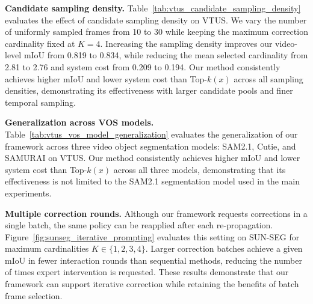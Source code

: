 


\noindent\textbf{Candidate sampling density.}
Table~\ref{tab:vtus_candidate_sampling_density} evaluates the effect of
candidate sampling density on VTUS. We vary the number of
uniformly sampled frames from 10 to 30 while keeping the
maximum correction cardinality fixed at $K=4$.
Increasing the sampling density improves our video-level mIoU
from 0.819 to 0.834, while reducing the mean selected
cardinality from 2.81 to 2.76 and system cost from 0.209
to 0.194. Our method consistently achieves higher mIoU
and lower system cost than Top-$k(x)$ across all sampling
densities, demonstrating its effectiveness with larger
candidate pools and finer temporal sampling.



\noindent\textbf{Generalization across VOS models.}
Table~\ref{tab:vtus_vos_model_generalization} evaluates
the generalization of our framework across three video object
segmentation models: SAM2.1, Cutie, and SAMURAI on VTUS.
Our method consistently achieves higher mIoU and lower system
cost than Top-$k(x)$ across all three models, demonstrating
that its effectiveness is not limited to the SAM2.1 segmentation
model used in the main experiments.



\noindent\textbf{Multiple correction rounds.}
Although our framework requests corrections in a single batch,
the same policy can be reapplied after each re-propagation.
Figure~\ref{fig:sunseg_iterative_prompting} evaluates this setting
on SUN-SEG for maximum cardinalities $K\in\{1,2,3,4\}$.
Larger correction batches achieve a given mIoU in fewer
interaction rounds than sequential methods, reducing the
number of times expert intervention is requested.
These results demonstrate that our framework can support
iterative correction while retaining the benefits of
batch frame selection.

